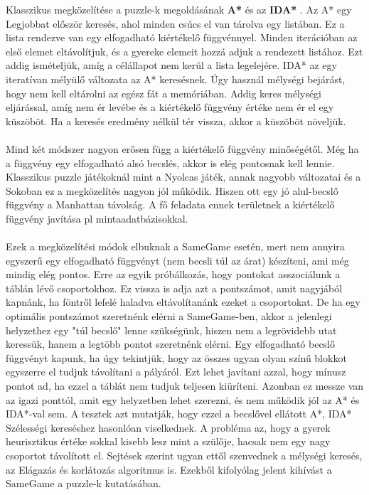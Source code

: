 \documentclass{article}
\begin{document}
	Klasszikus megközelítése a puzzle-k megoldásának \textbf{A*} \cite{hart1968formal} és az \textbf{IDA*} \cite{korf1985depth}. Az A* egy Legjobbat először keresés, ahol minden csúcs el van tárolva egy listában. Ez a lista rendezve van egy elfogadható kiértékelő függvénnyel. Minden iterációban az első elemet eltávolítjuk, és a gyereke elemeit hozzá adjuk a rendezett listához. Ezt addig ismételjük, amíg a célállapot nem kerül a lista legelejére. IDA* az egy iteratívan mélyülő változata az A* keresésnek. Úgy használ mélységi bejárást, hogy nem kell eltárolni az egész fát a memóriában. Addig keres mélységi eljárással, amíg nem ér levébe és a kiértékelő függvény értéke nem ér el egy küszöböt. Ha a keresés eredmény nélkül tér vissza, akkor a küszöböt növeljük.
	\\
	\\
	Mind két módszer nagyon erősen függ a kiértékelő függvény minőségétől. Még ha a függvény egy elfogadható alsó becslés, akkor is elég pontosnak kell lennie. Klasszikus puzzle játékoknál mint a Nyolcas játék, annak nagyobb változatai \cite{korf1985depth}  és a Sokoban \cite{junghanns2000pushing} ez a megközelítés nagyon jól működik. Hiszen ott egy jó alul-becslő függvény a Manhattan távolság. A fő feladata ennek területnek a kiértékelő függvény javítása pl mintaadatbázisokkal. \cite{felner2005dual} \cite{culberson1998pattern}
	\\
	\\
	Ezek a megközelítési módok elbuknak a SameGame esetén, mert nem annyira egyszerű egy elfogadható függvényt (nem becsli túl az árat) készíteni, ami még mindig elég pontos. Erre az egyik próbálkozás, hogy pontokat asszociálunk a táblán lévő csoportokhoz. Ez vissza is adja azt a pontszámot, amit nagyjából kapnánk, ha föntről lefelé haladva eltávolítanánk ezeket a csoportokat. De ha egy optimális pontszámot szeretnénk elérni a SameGame-ben, akkor a jelenlegi helyzethez egy "túl becslő" lenne szükségünk, hiszen nem a legrövidebb utat keressük, hanem a legtöbb pontot szeretnénk elérni. Egy elfogadható becslő függvényt kapunk, ha úgy tekintjük, hogy az összes ugyan olyan színű blokkot egyszerre el tudjuk távolítani a pályáról. Ezt lehet javítani azzal, hogy mínusz pontot ad, ha ezzel a táblát nem tudjuk teljesen kiüríteni. Azonban ez messze van az igazi ponttól, amit egy helyzetben lehet szerezni, és nem működik jól az A* és IDA*-val sem. A tesztek azt mutatják, hogy ezzel a becslővel ellátott A*, IDA* Szélességi kereséshez hasonlóan viselkednek.\cite{SCHADD20123} A probléma az, hogy a gyerek heurisztikus értéke sokkal kisebb lesz mint a szülője, hacsak nem egy nagy csoportot távolított el. Sejtések szerint ugyan ettől szenvednek a mélységi keresés, az Elágazás és korlátozás algoritmus is. \cite{vempaty1991depth} Ezekből kifolyólag jelent kihívást a SameGame a puzzle-k kutatásában.
	
\end{document}
